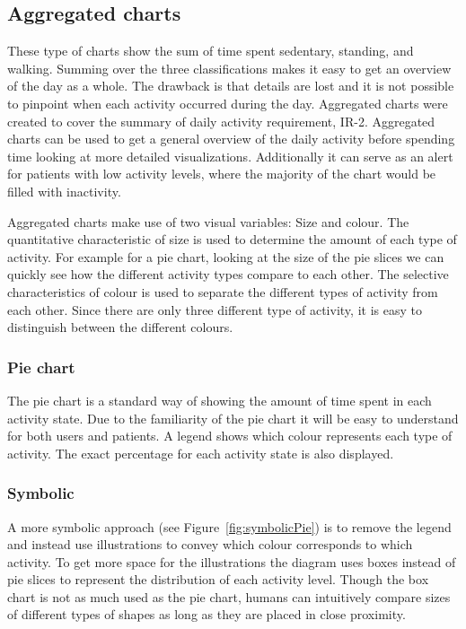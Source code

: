 \subsection{Aggregated charts}
These type of charts show the sum of time spent sedentary, standing, and walking. Summing over the three classifications makes it easy to get an overview of the day as a whole. The drawback is that details are lost and it is not possible to pinpoint when each activity occurred during the day. Aggregated charts were created to cover the summary of daily activity requirement, IR-2. Aggregated charts can be used to get a general overview of the daily activity before spending time looking at more detailed visualizations. Additionally it can serve as an alert for patients with low activity levels, where the majority of the chart would be filled with inactivity.

Aggregated charts make use of two visual variables: Size and colour. The quantitative characteristic of size is used to determine the amount of each type of activity. For example for a pie chart, looking at the size of the pie slices we can quickly see how the different activity types compare to each other. The selective characteristics of colour is used to separate the different types of activity from each other. Since there are only three different type of activity, it is easy to distinguish between the different colours. 

\subsubsection{Pie chart}
The pie chart is a standard way of showing the amount of time spent in each activity state. Due to the familiarity of the pie chart it will be easy to understand for both users and patients. A legend shows which colour represents each type of activity. The exact percentage for each activity state is also displayed.

\subsubsection{Symbolic}
A more symbolic approach (see Figure~\ref{fig:symbolicPie}) is to remove the legend and instead use illustrations to convey which colour corresponds to which activity. To get more space for the illustrations the diagram uses boxes instead of pie slices to represent the distribution of each activity level. Though the box chart is not as much used as the pie chart, humans can intuitively compare sizes of different types of shapes as long as they are placed in close proximity. 

